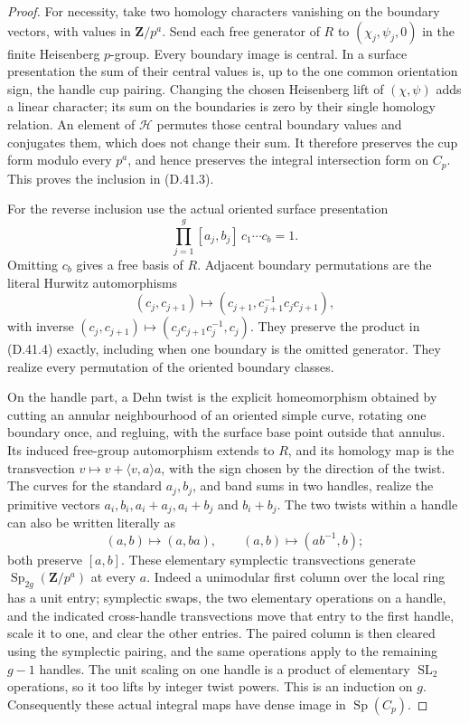 \begin{proof}
For necessity, take two homology characters
vanishing on the boundary vectors, with values
in \(\mathbf Z/p^a\).
Send each free generator of \(R\) to
\((\chi_j,\psi_j,0)\) in the finite Heisenberg
\(p\)-group.  Every boundary image is central.
In a surface presentation the sum of their
central values is, up to the one common
orientation sign, the handle cup pairing.
Changing the chosen Heisenberg lift of
\((\chi,\psi)\) adds a linear character; its
sum on the boundaries is zero by their
single homology relation.
An element of \(\mathcal H\) permutes those
central boundary values and conjugates them,
which does not change their sum.
It therefore preserves the cup form modulo
every \(p^a\), and hence preserves the
integral intersection form on \(C_p\).
This proves the inclusion in
\textup{(D.41.3)}.

For the reverse inclusion use the actual
oriented surface presentation
\[
 \prod_{j=1}^g[a_j,b_j]\,c_1\cdots c_b=1.
 \tag{D.41.4}
\]
Omitting \(c_b\) gives a free basis of \(R\).
Adjacent boundary permutations are the literal
Hurwitz automorphisms
\[
 (c_j,c_{j+1})\longmapsto
    (c_{j+1},c_{j+1}^{-1}c_jc_{j+1}),
 \tag{D.41.5}
\]
with inverse
\((c_j,c_{j+1})\mapsto
(c_jc_{j+1}c_j^{-1},c_j)\).
They preserve the product in
\textup{(D.41.4)} exactly, including when one
boundary is the omitted generator.
They realize every permutation of the
oriented boundary classes.

On the handle part, a Dehn twist is the
explicit homeomorphism obtained by cutting
an annular neighbourhood of an oriented
simple curve, rotating one boundary once,
and regluing, with the surface base point
outside that annulus.
Its induced free-group automorphism extends
to \(R\), and its homology map is the
transvection
\(v\mapsto v+\langle v,a\rangle a\), with
the sign chosen by the direction of the twist.
The curves for the standard \(a_j,b_j\),
and band sums in two handles, realize the
primitive vectors \(a_i,b_i,a_i+a_j,a_i+b_j\)
and \(b_i+b_j\).
The two twists within a handle can also be
written literally as
\[
 (a,b)\mapsto(a,ba),\qquad
 (a,b)\mapsto(ab^{-1},b);
 \tag{D.41.6}
\]
both preserve \([a,b]\).
These elementary symplectic transvections
generate \(\operatorname{Sp}_{2g}(\mathbf Z/p^a)\)
at every \(a\).
Indeed a unimodular first column over the
local ring has a unit entry; symplectic swaps,
the two elementary operations on a handle,
and the indicated cross-handle transvections
move that entry to the first handle, scale it
to one, and clear the other entries.
The paired column is then cleared using the
symplectic pairing, and the same operations
apply to the remaining \(g-1\) handles.
The unit scaling on one handle is a product
of elementary \(\operatorname{SL}_2\)
operations, so it too lifts by integer
twist powers.  This is an induction on \(g\).
Consequently these actual integral maps have
dense image in \(\operatorname{Sp}(C_p)\).


\end{proof}
